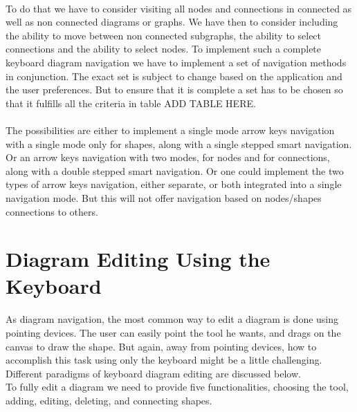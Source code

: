 \begin{itemize}
\paragraph{}
To do that we have to consider visiting all nodes and connections in connected as well as non connected diagrams or graphs. We have then to consider including the ability to move between non connected subgraphs, the ability to select connections and the ability to select nodes. To implement such a complete keyboard diagram navigation we have to implement a set of navigation methods in conjunction. The exact set is subject to change based on the application and the user preferences. But to ensure that it is complete a set has to be chosen so that it fulfills all the criteria in table ADD TABLE HERE.

\paragraph{}
The possibilities are either to implement a single mode arrow keys navigation with a single mode only for shapes, along with a single stepped smart navigation. Or an arrow keys navigation with two modes, for nodes and for connections, along with a double stepped smart navigation. Or one could implement the two types of arrow keys navigation, either separate, or both integrated into a single navigation mode. But this will not offer navigation based on nodes/shapes connections to others.

\end{itemize}


\section{Diagram Editing Using the Keyboard}
As diagram navigation, the most common way to edit a diagram is done using pointing devices. The user can easily point the tool he wants, and drags on the canvas to draw the shape. But again, away from pointing devices, how to accomplish this task using only the keyboard might be a little challenging. Different paradigms of keyboard diagram editing are discussed below.\\
To fully edit a diagram we need to provide five functionalities, choosing the tool, adding, editing, deleting, and connecting shapes.

